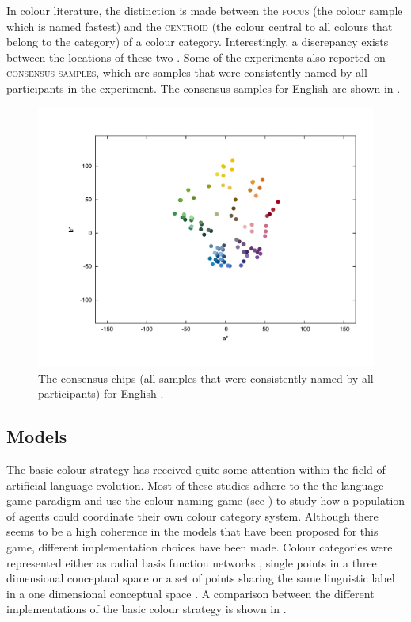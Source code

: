 In colour literature, the distinction is made between the \textsc{focus}
(the colour sample which is named fastest) and the \textsc{centroid}
(the colour central to all colours that belong to the category) of a
colour category. Interestingly, a discrepancy exists between the
locations of these two \citep{sturges95location}. Some of the
experiments also reported on \textsc{consensus samples}, which are samples that were
consistently named by all participants in the experiment. The
consensus samples for English \citep{sturges95location} are shown in
.

\begin{figure}[htbp]
  \begin{center}
    \includegraphics[width=.8\textwidth]{./basic-strategy/figures/sturges-consensus-chips.pdf}
    \caption[Consensus chips for English]{The consensus chips (all
      samples that were consistently named by all participants) for
      English \citep{sturges95location}.}
    \label{f:basic-consensus-chips-english}
  \end{center}
\end{figure}

\subsection{Models}

The basic colour strategy has received quite some attention
within the field of artificial language evolution. Most of these
studies adhere to the the language game paradigm and use the colour
naming game (see ) to study
how a population of agents could coordinate their own colour category
system. Although there seems to be a high coherence in the models that
have been proposed for this game, different implementation choices
have been made. Colour categories were represented either as radial
basis function networks \citep{steels05coordinating}, single points in
a three dimensional conceptual space \citep{belpaeme05explaining,
  belpaeme07language} or a set of points sharing the same linguistic
label in a one dimensional conceptual space \citep{puglisi08cultural,
  baronchelli10modeling}. A comparison between the different
implementations of the basic colour strategy is shown in .


